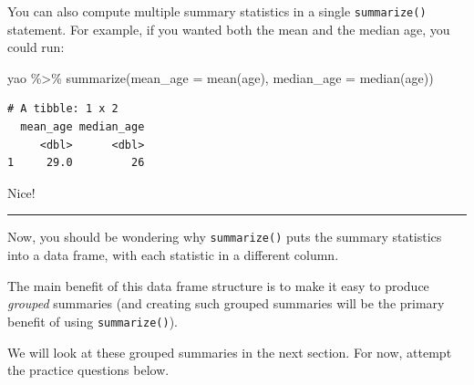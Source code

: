 \documentclass[
  letterpaper,
  DIV=11,
  numbers=noendperiod]{scrreprt}
\newenvironment{Shaded}{\begin{snugshade}}{\end{snugshade}}
\newcommand{\AttributeTok}[1]{\textcolor[rgb]{0.40,0.45,0.13}{#1}}
\newcommand{\FunctionTok}[1]{\textcolor[rgb]{0.28,0.35,0.67}{#1}}
\newcommand{\NormalTok}[1]{\textcolor[rgb]{0.00,0.23,0.31}{#1}}
\newcommand{\SpecialCharTok}[1]{\textcolor[rgb]{0.37,0.37,0.37}{#1}}
\begin{document}
You can also compute multiple summary statistics in a single
\texttt{summarize()} statement. For example, if you wanted both the mean
and the median age, you could run:

\begin{Shaded}
\begin{Highlighting}[]
\NormalTok{yao }\SpecialCharTok{\%\textgreater{}\%} 
  \FunctionTok{summarize}\NormalTok{(}\AttributeTok{mean\_age =} \FunctionTok{mean}\NormalTok{(age), }
            \AttributeTok{median\_age =} \FunctionTok{median}\NormalTok{(age))}
\end{Highlighting}
\end{Shaded}

\begin{verbatim}
# A tibble: 1 x 2
  mean_age median_age
     <dbl>      <dbl>
1     29.0         26
\end{verbatim}

Nice!

\begin{center}\rule{0.5\linewidth}{0.5pt}\end{center}

Now, you should be wondering why \texttt{summarize()} puts the summary
statistics into a data frame, with each statistic in a different column.

The main benefit of this data frame structure is to make it easy to
produce \emph{grouped} summaries (and creating such grouped summaries
will be the primary benefit of using \texttt{summarize()}).

We will look at these grouped summaries in the next section. For now,
attempt the practice questions below.
\end{document}
